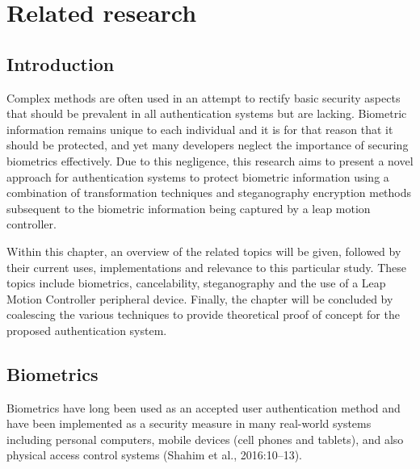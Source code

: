 
\chapter{Related research}

\ifpdf
    \graphicspath{{Chapter2/Figs/Raster/}{Chapter2/Figs/PDF/}{Chapter2/Figs/}}
\else
    \graphicspath{{Chapter2/Figs/Vector/}{Chapter2/Figs/}}
\fi


\section[Introduction]{Introduction}
Complex methods are often used in an attempt to rectify basic security aspects that should be prevalent in all authentication systems but are lacking. Biometric information remains unique to each individual and it is for that reason that it should be protected, and yet many developers neglect the importance of securing biometrics effectively. Due to this negligence, this research aims to present a novel approach for authentication systems to protect biometric information using a combination of transformation techniques and steganography encryption methods subsequent to the biometric information being captured by a leap motion controller. 

Within this chapter, an overview of the related topics will be given, followed by their current uses, implementations and relevance to this particular study. These topics include biometrics, cancelability, steganography and the use of a Leap Motion Controller peripheral device. Finally, the chapter will be concluded by coalescing the various techniques to provide theoretical proof of concept for the proposed authentication system.


\section[Biometrics]{Biometrics}
Biometrics have long been used as an accepted user authentication method and have been implemented as a security measure in many real-world systems including personal computers, mobile devices (cell phones and tablets), and also physical access control systems (Shahim et al., 2016:10–13).

